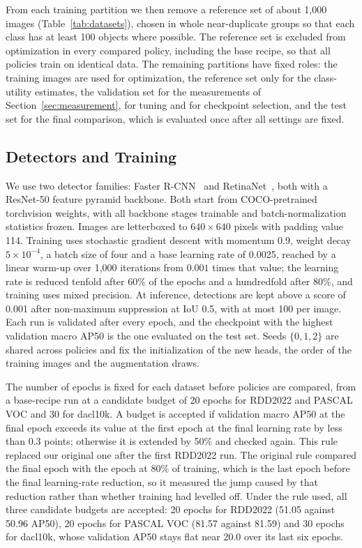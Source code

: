 \documentclass[conference]{IEEEtran}
\begin{document}
From each training partition we then remove a reference set of about 1,000 images (Table~\ref{tab:datasets}), chosen in whole near-duplicate groups so that each class has at least 100 objects where possible. The reference set is excluded from optimization in every compared policy, including the base recipe, so that all policies train on identical data. The remaining partitions have fixed roles: the training images are used for optimization, the reference set only for the class-utility estimates, the validation set for the measurements of Section~\ref{sec:measurement}, for tuning and for checkpoint selection, and the test set for the final comparison, which is evaluated once after all settings are fixed.

\subsection{Detectors and Training}
\label{sec:setup_training}

We use two detector families: Faster R-CNN~\cite{ren2017faster} and RetinaNet~\cite{lin2017focal}, both with a ResNet-50 feature pyramid backbone. Both start from COCO-pretrained torchvision weights, with all backbone stages trainable and batch-normalization statistics frozen. Images are letterboxed to $640\times640$ pixels with padding value 114. Training uses stochastic gradient descent with momentum 0.9, weight decay $5\times10^{-4}$, a batch size of four and a base learning rate of 0.0025, reached by a linear warm-up over 1,000 iterations from $0.001$ times that value; the learning rate is reduced tenfold after 60\% of the epochs and a hundredfold after 80\%, and training uses mixed precision. At inference, detections are kept above a score of 0.001 after non-maximum suppression at IoU 0.5, with at most 100 per image. Each run is validated after every epoch, and the checkpoint with the highest validation macro AP50 is the one evaluated on the test set. Seeds $\{0,1,2\}$ are shared across policies and fix the initialization of the new heads, the order of the training images and the augmentation draws.

The number of epochs is fixed for each dataset before policies are compared, from a base-recipe run at a candidate budget of 20 epochs for RDD2022 and PASCAL VOC and 30 for dacl10k. A budget is accepted if validation macro AP50 at the final epoch exceeds its value at the first epoch at the final learning rate by less than 0.3 points; otherwise it is extended by 50\% and checked again. This rule replaced our original one after the first RDD2022 run. The original rule compared the final epoch with the epoch at 80\% of training, which is the last epoch before the final learning-rate reduction, so it measured the jump caused by that reduction rather than whether training had levelled off. Under the rule used, all three candidate budgets are accepted: 20 epochs for RDD2022 (51.05 against 50.96 AP50), 20 epochs for PASCAL VOC (81.57 against 81.59) and 30 epochs for dacl10k, whose validation AP50 stays flat near 20.0 over its last six epochs.
\end{document}
